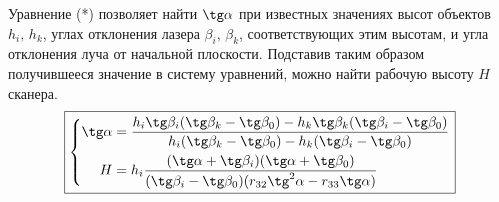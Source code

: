 \documentclass[a4paper, 12pt]{article}
\begin{document}
    Уравнение (*) позволяет найти $\tg\alpha$ при известных значениях высот объектов $h_i,\,h_k$, углах отклонения лазера $\beta_i,\,\beta_k$, соответствующих этим высотам, и угла отклонения луча от начальной плоскости. Подставив таким образом получившееся значение в систему уравнений, можно найти рабочую высоту $H$ сканера.
    \begin{equation*}
        \boxed{
            \left\{
            \begin{aligned}
                \tg\alpha &= \frac{h_i\tg\beta_i(\tg\beta_k-\tg\beta_0) - h_k\tg\beta_k(\tg\beta_i-\tg\beta_0)}{h_i(\tg\beta_k-\tg\beta_0) - h_k(\tg\beta_i-\tg\beta_0)}\\
                H &= h_i\frac{(\tg\alpha + \tg\beta_i)(\tg\alpha + \tg\beta_0)}{(\tg\beta_i - \tg\beta_0)(r_{32}\tg^2\alpha-r_{33}\tg\alpha)}
            \end{aligned}
            \right.
        }
    \end{equation*}
\end{document}
